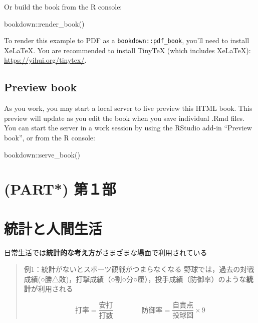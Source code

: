 \documentclass[
]{book}
\newenvironment{Shaded}{\begin{snugshade}}{\end{snugshade}}
\newcommand{\FunctionTok}[1]{\textcolor[rgb]{0.00,0.00,0.00}{#1}}
\newcommand{\NormalTok}[1]{#1}
\newcommand{\SpecialCharTok}[1]{\textcolor[rgb]{0.00,0.00,0.00}{#1}}
\theoremstyle{definition}
\theoremstyle{definition}
\theoremstyle{definition}
\theoremstyle{definition}
\theoremstyle{remark}
\begin{document}
Or build the book from the R console:

\begin{Shaded}
\begin{Highlighting}[]
\NormalTok{bookdown}\SpecialCharTok{::}\FunctionTok{render\_book}\NormalTok{()}
\end{Highlighting}
\end{Shaded}

To render this example to PDF as a \texttt{bookdown::pdf\_book}, you'll need to install XeLaTeX. You are recommended to install TinyTeX (which includes XeLaTeX): \url{https://yihui.org/tinytex/}.

\hypertarget{preview-book}{%
\section{Preview book}\label{preview-book}}

As you work, you may start a local server to live preview this HTML book. This preview will update as you edit the book when you save individual .Rmd files. You can start the server in a work session by using the RStudio add-in ``Preview book'', or from the R console:

\begin{Shaded}
\begin{Highlighting}[]
\NormalTok{bookdown}\SpecialCharTok{::}\FunctionTok{serve\_book}\NormalTok{()}
\end{Highlighting}
\end{Shaded}

\hypertarget{part-ux7b2cuxff11ux90e8}{%
\chapter{(PART*) 第１部}\label{part-ux7b2cuxff11ux90e8}}

\hypertarget{ux7d71ux8a08ux3068ux4ebaux9593ux751fux6d3b}{%
\chapter{統計と人間生活}\label{ux7d71ux8a08ux3068ux4ebaux9593ux751fux6d3b}}

日常生活では\textbf{統計的な考え方}がさまざまな場面で利用されている

\begin{quote}
例1：統計がないとスポーツ観戦がつまらなくなる
野球では，過去の対戦成績(○勝△敗)，打撃成績（○割○分○厘），投手成績（防御率）のような\textbf{統計}が利用される

\[
\text{打率}=\frac{\text{安打}}{\text{打数}} \qquad\qquad
\text{防御率}=\frac{\text{自責点}}{\text{投球回}} \times 9
\]
\end{quote}
\end{document}
